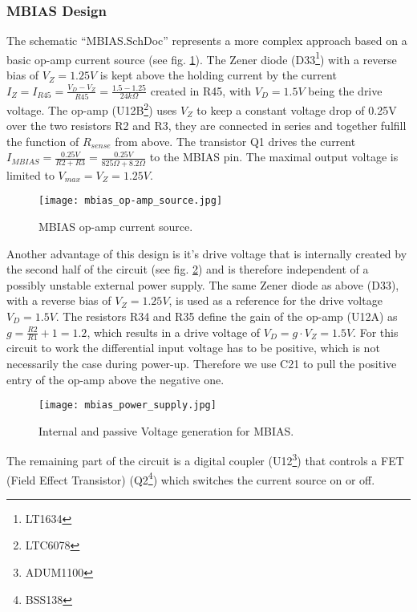 \subsubsection{MBIAS Design}
\label{sec:mbias_design}
The schematic ``MBIAS.SchDoc'' represents a more complex approach based on a basic op-amp current source (see fig. \ref{fig:mbias_op-amp_source}).
The Zener diode (D33\footnote{LT1634}) with a reverse bias of $V_Z = 1.25V$ is kept above the holding current by the current $I_Z = I_{R45} = \frac{V_D-V_Z}{R45} = \frac{1.5-1.25}{24k\Omega}$ created in R45, with $V_D = 1.5V$ being the drive voltage.
The op-amp (U12B\footnote{LTC6078}) uses $V_Z$ to keep a constant voltage drop of 0.25V over the two resistors R2 and R3, they are connected in series and together fulfill the function of $R_{sense}$ from above.
The transistor Q1 drives the current $I_{MBIAS} = \frac{0.25V}{R2+R3} = \frac{0.25V}{825\Omega+8.2\Omega}$ to the MBIAS pin.
The maximal output voltage is limited to $V_{max} = V_Z = 1.25V$.
\begin{figure}[H]
    \centering
    \texttt{[image: mbias\_op-amp\_source.jpg]}
    \caption[MBIAS Op-amp Current Source]{MBIAS op-amp current source.}
    \label{fig:mbias_op-amp_source}
\end{figure}

Another advantage of this design is it's drive voltage that is internally created by the second half of the circuit (see fig. \ref{fig:mbias_power_supply}) and is therefore independent of a possibly unstable external power supply.
The same Zener diode as above (D33), with a reverse bias of $V_Z = 1.25V$, is used as a reference for the drive voltage $V_D = 1.5V$.
The resistors R34 and R35 define the gain of the op-amp (U12A) as $g = \frac{R2}{R1}+1 = 1.2$, which results in a drive voltage of $V_D = g\cdot V_Z = 1.5V$.
For this circuit to work the differential input voltage has to be positive, which is not necessarily the case during power-up.
Therefore we use C21 to pull the positive entry of the op-amp above the negative one.
\begin{figure}[H]
    \centering
    \texttt{[image: mbias\_power\_supply.jpg]}
    \caption[MBIAS Voltage Generation]{Internal and passive Voltage generation for MBIAS.}
    \label{fig:mbias_power_supply}
\end{figure}

The remaining part of the circuit is a digital coupler (U12\footnote{ADUM1100}) that controls a FET (Field Effect Transistor) (Q2\footnote{BSS138}) which switches the current source on or off.


